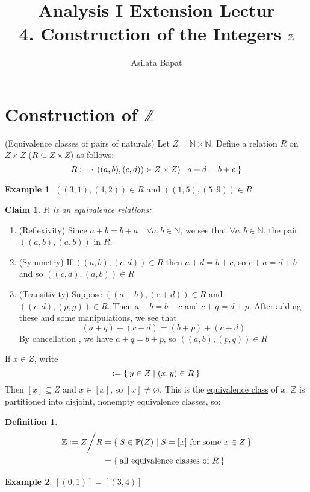 \documentclass[12pt]{amsart}
\title[Construction of the $\bbZ$]
	{Analysis I Extension Lectur\\4. Construction of the Integers $\bbZ$}
\author{Asilata Bapat}
\newcommand{\bbN}{\mathbb{N}}
\newcommand{\bbZ}{\mathbb{Z}}
\newcommand{\bbP}{\mathbb{P}}
\theoremstyle{plain}
\newtheorem*{claim}{Claim}
\theoremstyle{remark}
\theoremstyle{definition}
\newtheorem*{define}{Definition}
\newtheorem*{eg}{Example}
\begin{document}
\maketitle
{}

\section*{Construction of $\bbZ$}
(Equivalence classes of pairs of naturals)
\newline
Let $Z = \bbN\times \bbN$. Define a relation $R$ on $Z \times Z$ ($R \subseteq Z \times Z$) as follows:
\begin{equation*}
R \vcentcolon = \Set{ \left( (a,b),(c,d) \right) \in Z \times Z) | a+d = b+c}
\end{equation*}
\begin{eg}
$\left( (3,1),(4,2) \right) \in R$ and $\left( (1,5),(5,9) \right) \in R$

\end{eg}
\begin{claim}
$R$ is an equivalence relations:
\end{claim}
\begin{enumerate}[(1)]
	\item (Reflexivity) 
		Since $a+b = b+a\quad \forall a,b \in \bbN$, we see that $\forall a, b \in \bbN$, the pair $((a,b), (a,b))$ in $R$.
	\item (Symmetry)
		If $((a,b), (c,d))\in R$ then $a+d = b+c$, so $c+a = d+b$ and so $((c,d), (a,b))\in R$
	\item (Transitivity)
		Suppose $((a+b),(c+d))\in R$ and $((c,d),(p,g)) \in R$. Then $a+b = b + c $ and $c + q = d + p$. After adding these and some manipulations, we see that 
		\begin{equation*}
			(a+q) + (c+d) = (b+p) + (c+d)
		\end{equation*}
		By cancellation , we have $a+q = b+ p$, so $((a,b),(p,q)) \in R$
\end{enumerate}
If $x \in Z$, write
\begin{equation*}
	[x] \vcentcolon = \Set{ y \in Z | (x,y) \in R }
\end{equation*}
Then $[x] \subseteq Z$ and $x \in [x]$, so $[x] \neq \varnothing$. This is the \ul{equivalence class} of $x$. $\bbZ$ is partitioned into disjoint, nonempty equivalence classes, so:
\begin{define}
	\begin{equation*}
	\begin{split} 
		\bbZ \vcentcolon = Z \bigg/ R &= \Set{ S \in \bbP(Z)| S = [x] \mbox{ for some } x \in Z}\\
		&=  \Set{\mbox{all equivalence classes of $R$}}
	\end{split}
	\end{equation*}
\end{define}
\begin{eg}
	$[(0,1)] = [(3,4)]$
\end{eg}
\end{document}

